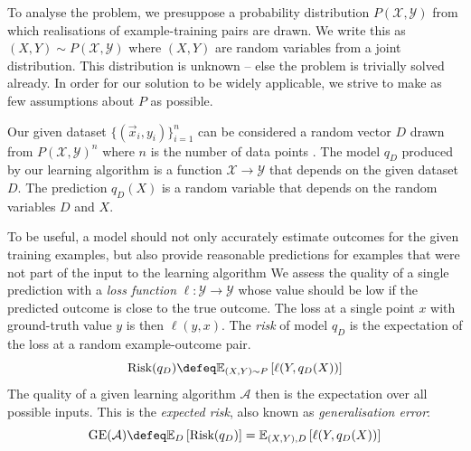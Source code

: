 \documentclass[
    a4paper, %
	fontsize=10pt, %
	twoside=false, %
]{kaobook}
\begin{document}
To analyse the problem, we presuppose a probability distribution $P(\mathcal{X}, \mathcal{Y})$ from which realisations of example-training pairs are drawn. We write this as $(X, Y) \sim P(\mathcal{X}, \mathcal{Y})$ where $(X,Y)$ are random variables from a joint distribution.
This distribution is unknown -- else the problem is trivially solved already. In order for our solution to be widely applicable, we strive to make as few assumptions about $P$ as possible. 

Our given dataset $\{ (\vec{x}_{i}, y_{i}) \}_{i=1}^n$ can be considered a random vector $D$ drawn from $P(\mathcal{X}, \mathcal{Y})^n$ where $n$ is the number of data points
. 
The model $q_D$ produced by our learning algorithm is a function $\mathcal{X} \to \mathcal{Y}$ that depends on the given dataset $D$. The prediction $q_{D}(X)$ is a random variable that depends on the random variables $D$ and $X$.

To be useful, a model should not only accurately estimate outcomes for the given training examples, but also provide reasonable predictions for examples that were not part of the input to the learning algorithm
%
We assess the quality of a single prediction with a \textit{loss function} $\ell: \mathcal{Y} \to \mathcal{Y}$ whose value should be low if the predicted outcome is close to the true outcome. The loss at a single point $x$ with ground-truth value $y$ is then $\ell(y,x)$. 
%
The \textit{risk} of model $q_{D}$ is the expectation of the loss at a random example-outcome pair.
$$
\text{Risk}(q_{D}) \defeq \mathbb{E}_{(X,Y)\sim P}\left[ \ell(Y, q_{D}(X)) \right] 
$$
%
The quality of a given learning algorithm $\mathcal{A}$ then is the expectation over all possible inputs. This is 
the \textit{expected risk}, also known as \textit{generalisation error}:
$$
\text{GE}(\mathcal{A}) \defeq \mathbb{E}_{D}\left[ \text{Risk}(q_{D}) \right]  = \mathbb{E}_{(X,Y), D}\left[ \ell(Y, q_{D}(X)) \right] 
$$
\end{document}
